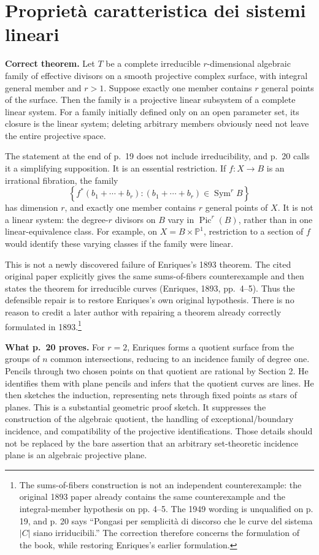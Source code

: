 \section{Proprietà caratteristica dei sistemi lineari}
\label{enriques-I-4}

\textbf{Correct theorem.} Let \(T\) be a complete irreducible \(r\)-dimensional algebraic family of effective divisors on a smooth projective complex surface, with integral general member and \(r>1\). Suppose exactly one member contains \(r\) general points of the surface. Then the family is a projective linear subsystem of a complete linear system. For a family initially defined only on an open parameter set, its closure is the linear system; deleting arbitrary members obviously need not leave the entire projective space.

The statement at the end of p.~19 does not include irreducibility, and p.~20 calls it a simplifying supposition. It is an essential restriction. If \(f:X\to B\) is an irrational fibration, the family \[
\left\{f^*(b_1+\cdots+b_r):(b_1+\cdots+b_r)\in\operatorname{Sym}^rB\right\}
\] has dimension \(r\), and exactly one member contains \(r\) general points of \(X\). It is not a linear system: the degree-\(r\) divisors on \(B\) vary in \(\operatorname{Pic}^r(B)\), rather than in one linear-equivalence class. For example, on \(X=B\times\mathbb P^1\), restriction to a section of \(f\) would identify these varying classes if the family were linear.

This is not a newly discovered failure of Enriques's 1893 theorem. The cited original paper explicitly gives the same sums-of-fibers counterexample and then states the theorem for irreducible curves (Enriques, 1893, pp.~4--5). Thus the defensible repair is to restore Enriques's own original hypothesis. There is no reason to credit a later author with repairing a theorem already correctly formulated in 1893.\footnote{The sums-of-fibers construction is not an independent counterexample: the original 1893 paper already contains the same counterexample and the integral-member hypothesis on pp. 4--5. The 1949 wording is unqualified on p. 19, and p. 20 says ``Pongasi per semplicità di discorso che le curve del sistema \(|C|\) siano irriducibili.'' The correction therefore concerns the formulation of the book, while restoring Enriques's earlier formulation.}

\textbf{What p.~20 proves.} For \(r=2\), Enriques forms a quotient surface from the groups of \(n\) common intersections, reducing to an incidence family of degree one. Pencils through two chosen points on that quotient are rational by Section 2. He identifies them with plane pencils and infers that the quotient curves are lines. He then sketches the induction, representing nets through fixed points as stars of planes. This is a substantial geometric proof sketch. It suppresses the construction of the algebraic quotient, the handling of exceptional/boundary incidence, and compatibility of the projective identifications. Those details should not be replaced by the bare assertion that an arbitrary set-theoretic incidence plane is an algebraic projective plane.

